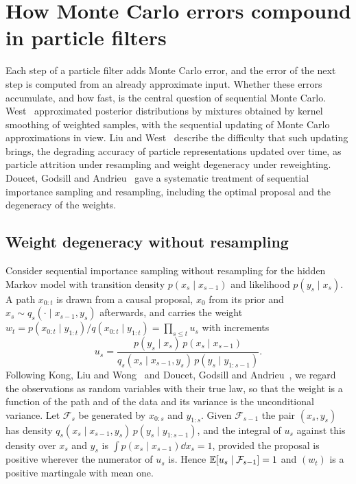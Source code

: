 \section{How Monte Carlo errors compound in particle filters}
\label{sec:pf_errors}

Each step of a particle filter adds Monte Carlo error, and the error of the next step is computed from an already approximate input. Whether these errors accumulate, and how fast, is the central question of sequential Monte Carlo. West~\cite{west1993} approximated posterior distributions by mixtures obtained by kernel smoothing of weighted samples, with the sequential updating of Monte Carlo approximations in view. Liu and West~\cite{liuwest2001} describe the difficulty that such updating brings, the degrading accuracy of particle representations updated over time, as particle attrition under resampling and weight degeneracy under reweighting. Doucet, Godsill and Andrieu~\cite{dga2000} gave a systematic treatment of sequential importance sampling and resampling, including the optimal proposal and the degeneracy of the weights.

\subsection{Weight degeneracy without resampling}

Consider sequential importance sampling without resampling for the hidden Markov model with transition density $p(x_s\mid x_{s-1})$ and likelihood $p(y_s\mid x_s)$. A path $x_{0:t}$ is drawn from a causal proposal, $x_0$ from its prior and $x_s\sim q_s(\cdot\mid x_{s-1},y_s)$ afterwards, and carries the weight $w_t = p(x_{0:t}\mid y_{1:t})/q(x_{0:t}\mid y_{1:t}) = \prod_{s\leq t}u_s$ with increments
\[
u_s = \frac{p(y_s\mid x_s)\,p(x_s\mid x_{s-1})}{q_s(x_s\mid x_{s-1},y_s)\,p(y_s\mid y_{1:s-1})}.
\]
Following Kong, Liu and Wong~\cite{klw1994} and Doucet, Godsill and Andrieu~\cite[Proposition~1]{dga2000}, we regard the observations as random variables with their true law, so that the weight is a function of the path and of the data and its variance is the unconditional variance. Let $\mathcal{F}_s$ be generated by $x_{0:s}$ and $y_{1:s}$. Given $\mathcal{F}_{s-1}$ the pair $(x_s,y_s)$ has density $q_s(x_s\mid x_{s-1},y_s)\,p(y_s\mid y_{1:s-1})$, and the integral of $u_s$ against this density over $x_s$ and $y_s$ is $\int p(x_s\mid x_{s-1})\dd x_s = 1$, provided the proposal is positive wherever the numerator of $u_s$ is. Hence $\mathbb{E}[u_s\mid\mathcal{F}_{s-1}] = 1$ and $(w_t)$ is a positive martingale with mean one.

